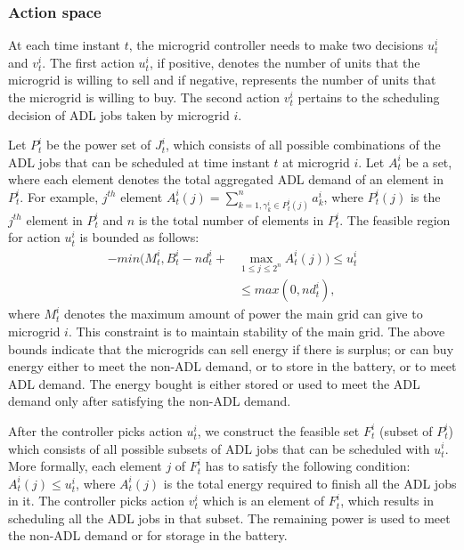 \subsubsection{Action space}
At each time instant $t$, the microgrid controller needs to make two decisions $u_{t}^{i}$ and $v_{t}^{i}$. The first action $u_{t}^{i}$, if positive, denotes the number of units that the microgrid is willing to sell and if negative, represents the number of units that the microgrid is willing to buy. The second action $v_{t}^{i}$ pertains to the scheduling decision of ADL jobs taken by microgrid $i$.

Let $P_{t}^{i}$ be the power set of $J_{t}^{i}$, which consists of all possible combinations of the ADL jobs that can be scheduled at time instant $t$ at microgrid $i$. Let  $A_{t}^{i}$ be a set, where each element denotes the total aggregated ADL demand of an element in $P_{t}^{i}$. For example, $j^{th}$ element $A_{t}^{i}(j) = \sum_{k=1, \gamma_k^i \in P_{t}^{i}(j) }^n a_k^i$, where $ P_{t}^{i}(j)$ is the $j^{th}$ element in  $P_{t}^{i}$ and $n$ is the total number of elements in $P_{t}^{i}$.
 The feasible region for action $u_{t}^{i}$ is bounded as follows:
\begin{align}
-min(M_t^i, B_t^i - nd_t^i + &\max_{1\leq j \leq 2^n} A_t^i(j) ) \leq u_t^i \nonumber\\ &\leq max(0, nd_t^i),
\end{align}
where $M_t^i$ denotes the maximum amount of power the main grid can give to microgrid $i$. This constraint is to maintain stability of the main grid. The above bounds indicate that the  microgrids can sell energy if there is surplus; or can buy energy either to meet the non-ADL demand, or to store in the battery, or to meet ADL demand. The energy bought is either stored or used to meet the ADL demand only after satisfying the non-ADL demand. 

After the controller picks action $u_{t}^{i}$, we construct the feasible set $F_{t}^{i}$ (subset of $P_{t}^{i}$) which  consists of all possible subsets of ADL jobs that can be scheduled with $u_{t}^{i}$. More formally, each element $j$ of  $F_{t}^{i}$ has to satisfy the following condition:   $A_t^i(j) \leq u_{t}^{i} $, where $A_t^i(j)$ is the total energy required to finish all the ADL jobs in it. The controller picks action $v_{t}^{i}$ which is an element of $F_{t}^{i}$, which results in scheduling all the ADL jobs in that subset. The remaining power is used to meet the non-ADL demand or for storage in the battery.


